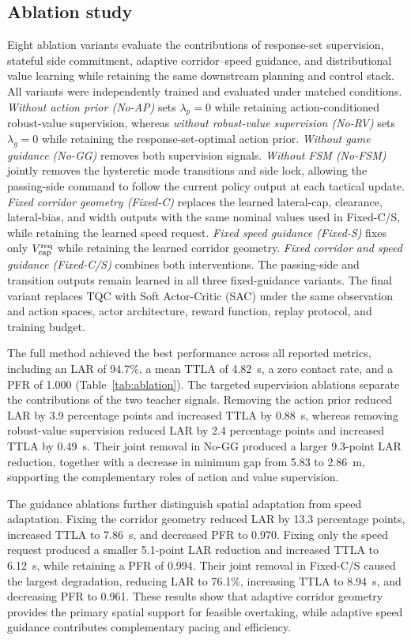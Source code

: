 \documentclass[journal,twoside,web]{ieeecolor}
\begin{document}
\subsection{Ablation study}
\label{subsec:ablation}

Eight ablation variants evaluate the contributions of response-set
supervision, stateful side commitment, adaptive corridor--speed guidance, and
distributional value learning while retaining the same downstream planning
and control stack. All variants were independently trained and evaluated under
matched conditions. \emph{Without action prior (No-AP)} sets
$\lambda_p=0$ while retaining action-conditioned robust-value supervision,
whereas \emph{without robust-value supervision (No-RV)} sets
$\lambda_g=0$ while retaining the response-set-optimal action prior.
\emph{Without game guidance (No-GG)} removes both supervision signals.
\emph{Without FSM (No-FSM)} jointly removes the hysteretic mode transitions
and side lock, allowing the passing-side command to follow the current policy
output at each tactical update. \emph{Fixed corridor geometry (Fixed-C)}
replaces the learned lateral-cap, clearance, lateral-bias, and width outputs
with the same nominal values used in Fixed-C/S, while retaining the learned
speed request. \emph{Fixed speed guidance (Fixed-S)} fixes only
$V_{\rm cap}^{\rm req}$ while retaining the learned corridor geometry.
\emph{Fixed corridor and speed guidance (Fixed-C/S)} combines both
interventions. The passing-side and transition outputs remain learned in all
three fixed-guidance variants. The final variant replaces TQC with Soft
Actor-Critic (SAC) under the same observation and action spaces, actor
architecture, reward function, replay protocol, and training budget.



The full method achieved the best performance across all reported metrics,
including an LAR of 94.7\%, a mean TTLA of 4.82~s, a zero contact rate, and a
PFR of 1.000 (Table~\ref{tab:ablation}). The targeted supervision ablations
separate the contributions of the two teacher signals. Removing the action
prior reduced LAR by 3.9 percentage points and increased TTLA by 0.88~s,
whereas removing robust-value supervision reduced LAR by 2.4 percentage
points and increased TTLA by 0.49~s. Their joint removal in No-GG produced a
larger 9.3-point LAR reduction, together with a decrease in minimum gap from
5.83 to 2.86~m, supporting the complementary roles of action and value
supervision.

The guidance ablations further distinguish spatial adaptation from speed
adaptation. Fixing the corridor geometry reduced LAR by 13.3 percentage points,
increased TTLA to 7.86~s, and decreased PFR to 0.970. Fixing only the speed
request produced a smaller 5.1-point LAR reduction and increased TTLA to
6.12~s, while retaining a PFR of 0.994. Their joint removal in Fixed-C/S
caused the largest degradation, reducing LAR to 76.1\%, increasing TTLA to
8.94~s, and decreasing PFR to 0.961. These results show that adaptive corridor
geometry provides the primary spatial support for feasible overtaking, while
adaptive speed guidance contributes complementary pacing and efficiency.
\end{document}
